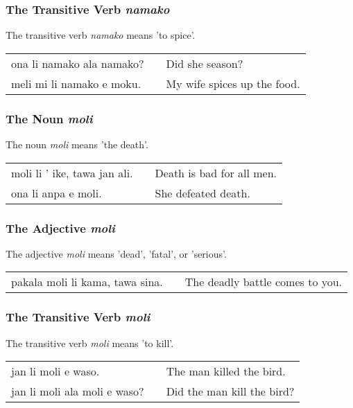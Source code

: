 \subsubsection*{The Transitive Verb \textit{namako}}
The transitive verb \textit{namako} means 'to spice'.

\begin{supertabular}{p{5,5cm}|ll}
    ona li namako ala namako? &  & Did she season?             \\
    meli mi li namako e moku. &  & My wife spices up the food. \\
\end{supertabular}

\subsubsection*{The Noun \textit{moli}}
The noun \textit{moli} means 'the death'.

\begin{supertabular}{p{5,5cm}|ll}
    moli li ' ike, tawa jan ali. &  & Death is bad for all men. \\
    ona li anpa e moli.          &  & She defeated death.       \\
\end{supertabular}

\subsubsection*{The Adjective \textit{moli}}
The adjective \textit{moli} means 'dead', 'fatal', or 'serious'.

\begin{supertabular}{p{5,5cm}|ll}
    pakala moli li kama, tawa sina. &  & The deadly battle comes to you. \\
\end{supertabular}

\subsubsection*{The Transitive Verb \textit{moli}}
The transitive verb \textit{moli} means 'to kill'.

\begin{supertabular}{p{5,5cm}|ll}
    jan li moli e waso.          &  & The man killed the bird.   \\
    jan li moli ala moli e waso? &  & Did the man kill the bird? \\
\end{supertabular}

